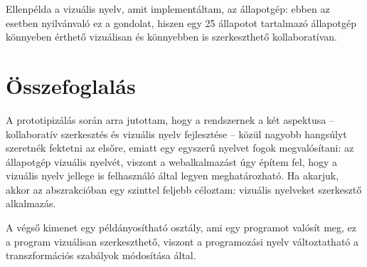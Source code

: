 Ellenpélda a vizuális nyelv, amit implementáltam, az állapotgép: ebben az esetben nyilvánvaló ez a gondolat, hiszen egy 25 állapotot tartalmazó állapotgép könnyeben érthető vizuálisan és könnyebben is szerkeszthető kollaboratívan.



\section{Összefoglalás}

A prototipizálás során arra jutottam, hogy a rendszernek a két aspektusa --  kollaboratív szerkesztés és vizuális nyelv fejlesztése -- közül nagyobb hangsúlyt szeretnék fektetni az elsőre, emiatt egy egyszerű nyelvet fogok megvalósítani: az állapotgép vizuális nyelvét, viszont a webalkalmazást úgy építem fel, hogy a vizuális nyelv jellege is felhasználó által legyen meghatározható. Ha akarjuk, akkor az abszrakcióban egy szinttel feljebb céloztam: vizuális nyelveket szerkesztő alkalmazás. 

A végső kimenet egy példányosítható osztály, ami egy programot valósít meg, ez a program vizuálisan szerkeszthető, viszont a programozási nyelv változtatható a transzformációs szabályok módosítása által.

